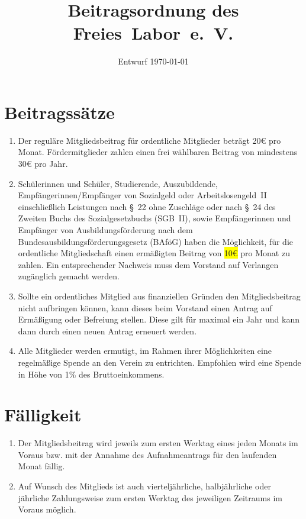 \documentclass[a4paper,12pt]{scrartcl}
\title{Beitragsordnung des Freies~Labor~e.~V.}
\date{Entwurf \today}
\begin{document}
\maketitle

\section{Beitragssätze}
\begin{enumerate}
  \item Der reguläre Mitgliedsbeitrag für ordentliche Mitglieder beträgt 20€
    pro Monat. Fördermitglieder zahlen einen frei wählbaren Beitrag von
    mindestens 30€ pro Jahr.
  \item Schülerinnen und Schüler, Studierende, Auszubildende, 
    Empfängerinnen/Empfänger von Sozialgeld oder Arbeitslosengeld~II 
    einschließlich Leistungen nach §~22 ohne Zuschläge oder nach §~24 des
    Zweiten Buchs des Sozialgesetzbuchs (SGB~II), sowie Empfängerinnen und 
    Empfänger von Ausbildungsförderung nach dem
    Bundesausbildungsförderungsgesetz (BAföG) haben die Möglichkeit, für die
    ordentliche Mitgliedschaft einen ermäßigten Beitrag von 
    \colorbox{yellow}{10€} pro Monat zu zahlen. Ein entsprechender Nachweis muss
    dem Vorstand auf Verlangen zugänglich gemacht werden.
  \item Sollte ein ordentliches Mitglied aus finanziellen Gründen den
    Mitgliedsbeitrag nicht aufbringen können, kann dieses beim Vorstand einen
    Antrag auf Ermäßigung oder Befreiung stellen. Diese gilt für maximal ein
    Jahr und kann dann durch einen neuen Antrag erneuert werden.
  \item Alle Mitglieder werden ermutigt, im Rahmen ihrer Möglichkeiten eine
    regelmäßige Spende an den Verein zu entrichten. Empfohlen wird eine Spende
    in Höhe von 1\% des Bruttoeinkommens.
\end{enumerate}

\section{Fälligkeit}
\begin{enumerate}
  \item Der Mitgliedsbeitrag wird jeweils zum ersten Werktag eines jeden Monats
    im Voraus bzw. mit der Annahme des Aufnahmeantrags für den laufenden Monat
    fällig.
  \item Auf Wunsch des Mitglieds ist auch vierteljährliche, halbjährliche oder
    jährliche Zahlungsweise zum ersten Werktag des jeweiligen Zeitraums im
    Voraus möglich.
\end{enumerate}
\end{document}
